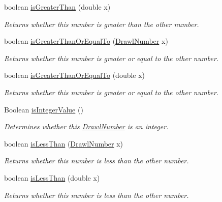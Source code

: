 \begin{DoxyCompactItemize}
boolean \hyperlink{classcom_1_1aarrelaakso_1_1drawl_1_1_drawl_number_a3c7176bcb037455fc1d9fd3b1f279916}{is\+Greater\+Than} (double x)
\begin{DoxyCompactList}\small\item\em Returns whether this number is greater than the other number. \end{DoxyCompactList}\item 
boolean \hyperlink{classcom_1_1aarrelaakso_1_1drawl_1_1_drawl_number_a85995fb2b1a5a80620b78a7a4f760e46}{is\+Greater\+Than\+Or\+Equal\+To} (\hyperlink{classcom_1_1aarrelaakso_1_1drawl_1_1_drawl_number}{Drawl\+Number} x)
\begin{DoxyCompactList}\small\item\em Returns whether this number is greater or equal to the other number. \end{DoxyCompactList}\item 
boolean \hyperlink{classcom_1_1aarrelaakso_1_1drawl_1_1_drawl_number_a2099cd81e0f9834548f8aea7814e9251}{is\+Greater\+Than\+Or\+Equal\+To} (double x)
\begin{DoxyCompactList}\small\item\em Returns whether this number is greater or equal to the other number. \end{DoxyCompactList}\item 
Boolean \hyperlink{classcom_1_1aarrelaakso_1_1drawl_1_1_drawl_number_a5f25d5df1753f8cb2a5853437156894a}{is\+Integer\+Value} ()
\begin{DoxyCompactList}\small\item\em Determines whether this \hyperlink{classcom_1_1aarrelaakso_1_1drawl_1_1_drawl_number}{Drawl\+Number} is an integer. \end{DoxyCompactList}\item 
boolean \hyperlink{classcom_1_1aarrelaakso_1_1drawl_1_1_drawl_number_a38686eecaa96cde870dd160d14524c04}{is\+Less\+Than} (\hyperlink{classcom_1_1aarrelaakso_1_1drawl_1_1_drawl_number}{Drawl\+Number} x)
\begin{DoxyCompactList}\small\item\em Returns whether this number is less than the other number. \end{DoxyCompactList}\item 
boolean \hyperlink{classcom_1_1aarrelaakso_1_1drawl_1_1_drawl_number_ae2e4d5bbd915221f90dc802e22630809}{is\+Less\+Than} (double x)
\begin{DoxyCompactList}\small\item\em Returns whether this number is less than the other number. \end{DoxyCompactList}\item 

\end{DoxyCompactItemize}
